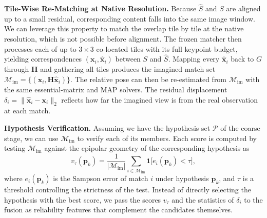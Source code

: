 \noindent\textbf{Tile-Wise Re-Matching at Native Resolution.}
Because $\widehat{S}$ and $S$ are aligned up to a small residual, corresponding content falls into the same image window. We can leverage this property to match the overlap tile by tile at the native resolution, which is not possible before alignment. The frozen matcher then processes each of up to $3{\times}3$ co-located tiles with its full keypoint budget, yielding correspondences $(\mathbf{x}_i,\hat{\mathbf{x}}_i)$ between $S$ and $\widehat{S}$. Mapping every $\hat{\mathbf{x}}_i$ back to $G$ through $\mathbf{H}$ and gathering all tiles produces the imagined match set $\mathcal{M}_{\text{im}}=\{(\mathbf{x}_i,\mathbf{H}\hat{\mathbf{x}}_i)\}$. The relative pose can then be re-estimated from $\mathcal{M}_{\text{im}}$ with the same essential-matrix and MAP solvers. The residual displacement $\delta_i=\lVert\hat{\mathbf{x}}_i-\mathbf{x}_i\rVert_2$ reflects how far the imagined view is from the real observation at each match.

\noindent\textbf{Hypothesis Verification.}
Assuming we have the hypothesis set $\mathcal{P}$ of the coarse stage, we can use $\mathcal{M}_{\text{im}}$ to verify each of its members. Each score is computed by testing $\mathcal{M}_{\text{im}}$ against the epipolar geometry of the corresponding hypothesis as
\begin{equation}
v_\tau(\mathbf{p}_k)=\frac{1}{|\mathcal{M}_{\text{im}}|}\sum_{i\in\mathcal{M}_{\text{im}}}\mathbf{1}\bigl[e_i(\mathbf{p}_k)<\tau\bigr],
\label{eq:verify}
\end{equation}
where $e_i(\mathbf{p}_k)$ is the Sampson error of match $i$ under hypothesis $\mathbf{p}_k$, and $\tau$ is a threshold controlling the strictness of the test. Instead of directly selecting the hypothesis with the best score, we pass the scores $v_\tau$ and the statistics of $\delta_i$ to the fusion as reliability features that complement the candidates themselves.

